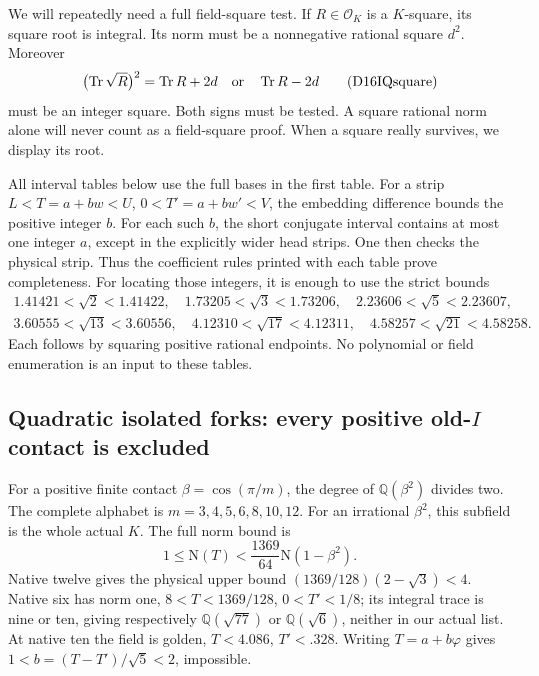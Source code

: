 \documentclass[11pt]{article}
\begin{document}
We will repeatedly need a full
field-square test.
If \(R\in\mathcal O_K\) is a \(K\)-square,
its square root is integral.
Its norm must be a nonnegative
rational square \(d^2\).
Moreover
\[
             \bigl(\operatorname{Tr}\sqrt R\bigr)^2
                 =\operatorname{Tr}R+2d
                    \quad\hbox{or}\quad
                   \operatorname{Tr}R-2d
\tag{D16IQsquare}\label{eq:arithD16Iquadraticsquare}
\]
must be an integer square.
Both signs must be tested.
A square rational norm alone will
never count as a field-square proof.
When a square really survives,
we display its root.

All interval tables below use the
full bases in the first table.
For a strip \(L<T=a+bw<U\),
\(0<T'=a+bw'<V\), the embedding
difference bounds the positive
integer \(b\).
For each such \(b\), the short
conjugate interval contains at most
one integer \(a\), except in the
explicitly wider head strips.
One then checks the physical strip.
Thus the coefficient rules printed
with each table prove completeness.
For locating those integers, it is
enough to use the strict bounds
\[
\begin{gathered}
1.41421<\sqrt2<1.41422,\quad
1.73205<\sqrt3<1.73206,\quad
2.23606<\sqrt5<2.23607,\\
3.60555<\sqrt{13}<3.60556,\quad
4.12310<\sqrt{17}<4.12311,\quad
4.58257<\sqrt{21}<4.58258 .
\end{gathered}
\]
Each follows by squaring positive
rational endpoints.
No polynomial or field enumeration
is an input to these tables.

\subsection[Quadratic isolated forks: every positive old-I contact is excluded]{Quadratic isolated forks: every positive old-\(I\) contact is excluded}
\label{app:arithD16Iquadraticcontacts}

For a positive finite contact
\(\beta=\cos(\pi/m)\), the degree
of \(\mathbb Q(\beta^2)\) divides two.
The complete alphabet is
\(m=3,4,5,6,8,10,12\).
For an irrational \(\beta^2\), this
subfield is the whole actual \(K\).
The full norm bound is
\[
             1\le\mathrm N(T)<
                    {\frac{1369}{64}}\mathrm N(1-\beta^2).
\]
Native twelve gives the physical
upper bound
\((1369/128)(2-\sqrt3)<4\).
Native six has norm one,
\(8<T<1369/128\), \(0<T'<1/8\);
its integral trace is nine or ten,
giving respectively \(\mathbb Q(\sqrt{77})\)
or \(\mathbb Q(\sqrt6)\), neither
in our actual list.
At native ten the field is golden,
\(T<4.086\), \(T'<.328\).
Writing \(T=a+b\varphi\) gives
\(1<b=(T-T')/\sqrt5<2\), impossible.
\end{document}
